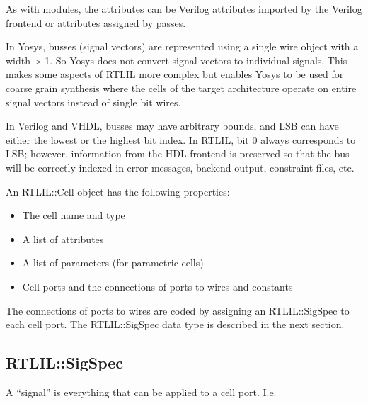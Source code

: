 As with modules, the attributes can be Verilog attributes imported by the
Verilog frontend or attributes assigned by passes.

In Yosys, busses (signal vectors) are represented using a single wire object
with a width > 1. So Yosys does not convert signal vectors to individual signals.
This makes some aspects of RTLIL more complex but enables Yosys to be used for
coarse grain synthesis where the cells of the target architecture operate on
entire signal vectors instead of single bit wires.

In Verilog and VHDL, busses may have arbitrary bounds, and LSB can have either
the lowest or the highest bit index. In RTLIL, bit 0 always corresponds to LSB;
however, information from the HDL frontend is preserved so that the bus will be
correctly indexed in error messages, backend output, constraint files, etc.

An RTLIL::Cell object has the following properties:

\begin{itemize}
\item The cell name and type
\item A list of attributes
\item A list of parameters (for parametric cells)
\item Cell ports and the connections of ports to wires and constants
\end{itemize}

The connections of ports to wires are coded by assigning an RTLIL::SigSpec
to each cell port. The RTLIL::SigSpec data type is described in the next section.

\subsection{RTLIL::SigSpec}

A ``signal'' is everything that can be applied to a cell port. I.e.


